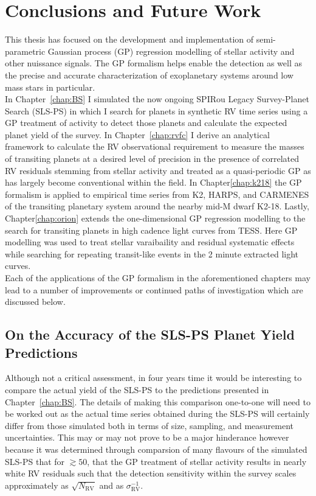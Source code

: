 \chapter{Conclusions and Future Work}

This thesis has focused on the development and implementation of
semi-parametric Gaussian process (GP) regression modelling of stellar activity
and other nuissance signals. The GP formalism helps enable the detection as
well as the precise and accurate characterization of exoplanetary systems
around low mass stars in particular. \\

In Chapter~\ref{chap:BS} I simulated the
now ongoing SPIRou Legacy Survey-Planet Search (SLS-PS)
in which I search for planets
in synthetic RV time series using a GP treatment of activity to detect
those planets and calculate the expected planet yield of the survey. In
Chapter~\ref{chap:rvfc} I derive an analytical framework to calculate the
RV observational requirement to measure the masses of transiting planets at
a desired level of precision in the presence of correlated RV residuals stemming
from stellar activity and treated as a quasi-periodic GP as has largely become
conventional within the field. In Chapter\ref{chap:k218} the GP formalism is
applied to empirical time series from K2, HARPS, and CARMENES of the transiting
planetary system around the nearby mid-M dwarf K2-18. Lastly,
Chapter\ref{chap:orion} extends the one-dimensional GP regression modelling to
the search for transiting planets in high cadence light curves from TESS. Here
GP modelling was used to treat stellar varaibaility and residual systematic
effects while searching for repeating transit-like events in the 2 minute
extracted light curves. \\

Each of the applications of the GP formalism in the aforementioned chapters
may lead to a number of improvements or continued paths of investigation which
are discussed below.

\section{On the Accuracy of the SLS-PS Planet Yield Predictions}
Although not a critical assessment, in four years time it would be interesting
to compare the actual yield of the SLS-PS to the predictions presented in
Chapter~\ref{chap:BS}. The details of making this comparison one-to-one will
need to be worked out as the actual time series obtained during the SLS-PS will
certainly differ from those simulated both in terms of size, sampling, and
measurement uncertainties. This may or may not prove to be a major hinderance
however because it was determined through comparsion of many flavours of the
simulated SLS-PS that for \nrv{} $\gtrsim 50$, that the GP treatment of stellar
activity results in nearly white RV residuals such that the detection
sensitivity within the survey scales approximately as $\sqrt{N_{\text{RV}}}$ and
as $\sigma_{\text{RV}}^{-1}$. \\

